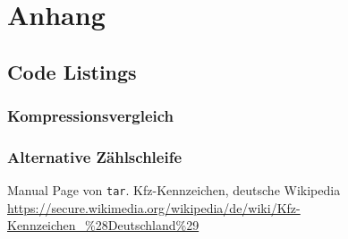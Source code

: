 \documentclass[12pt]{report}
\newcommand\gqq[1]{\glqq #1\grqq}
\begin{document}


\part{Anhang}
\begin{appendix}


\chapter{Code Listings}
\section{Kompressionsvergleich}
\label{listing:compression}
\lstset{language=bash}


\section{Alternative Zählschleife}
\label{listing:zahlen2}

\lstset{language=bash}

 


\end{appendix}

\begin{thebibliography}{n}
 Manual Page von \texttt{tar}.
 \gqq{Kfz-Kennzeichen}, deutsche Wikipedia \url{https://secure.wikimedia.org/wikipedia/de/wiki/Kfz-Kennzeichen_\%28Deutschland\%29}
\end{thebibliography}
\end{document}
